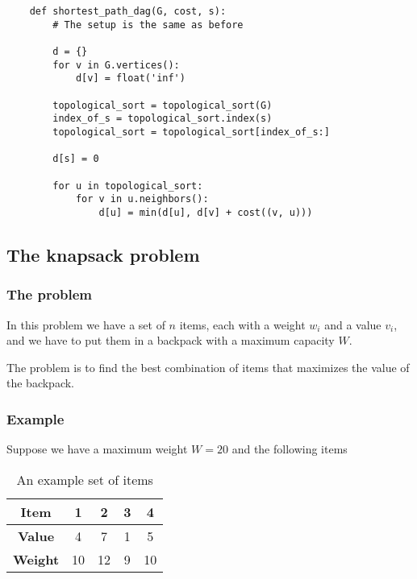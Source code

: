 \documentclass[12pt]{extarticle}
\begin{document}
\begin{verbatim}
    def shortest_path_dag(G, cost, s):
        # The setup is the same as before

        d = {}
        for v in G.vertices():
            d[v] = float('inf')

        topological_sort = topological_sort(G)
        index_of_s = topological_sort.index(s)
        topological_sort = topological_sort[index_of_s:]

        d[s] = 0

        for u in topological_sort:
            for v in u.neighbors():
                d[u] = min(d[u], d[v] + cost((v, u)))

\end{verbatim}

\subsection{The knapsack problem}

\subsubsection{The problem}

In this problem we have a set of $n$ items, each with a weight $w_i$ and a value $v_i$, and we have to put them in a backpack with a maximum capacity $W$.

The problem is to find the best combination of items that maximizes the value of the backpack.

\subsubsection{Example}

Suppose we have a maximum weight $W = 20$ and the following items

\begin{table}[H]
    \centering
    \begin{tabular}{ |c|c|c|c|c| }
        \hline
        \textbf{Item}   & 1  & 2  & 3 & 4  \\
        \hline
        \textbf{Value}  & 4  & 7  & 1 & 5  \\
        \textbf{Weight} & 10 & 12 & 9 & 10 \\
        \hline
    \end{tabular}

    \label{tab:knapsack_example}
    \caption{An example set of items}
\end{table}
\end{document}
